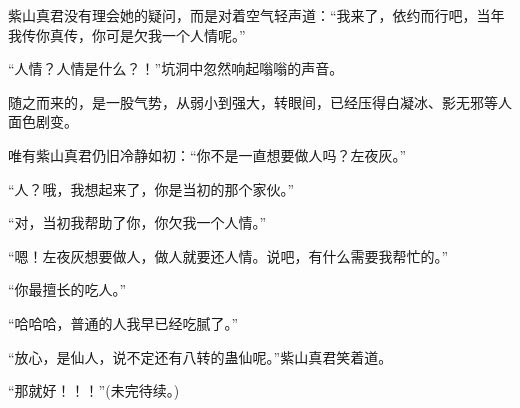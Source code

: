 \begin{this_body}
紫山真君没有理会她的疑问，而是对着空气轻声道：“我来了，依约而行吧，当年我传你真传，你可是欠我一个人情呢。”

“人情？人情是什么？！”坑洞中忽然响起嗡嗡的声音。

随之而来的，是一股气势，从弱小到强大，转眼间，已经压得白凝冰、影无邪等人面色剧变。

唯有紫山真君仍旧冷静如初：“你不是一直想要做人吗？左夜灰。”

“人？哦，我想起来了，你是当初的那个家伙。”

“对，当初我帮助了你，你欠我一个人情。”

“嗯！左夜灰想要做人，做人就要还人情。说吧，有什么需要我帮忙的。”

“你最擅长的吃人。”

“哈哈哈，普通的人我早已经吃腻了。”

“放心，是仙人，说不定还有八转的蛊仙呢。”紫山真君笑着道。

“那就好！！！”(未完待续。)

\end{this_body}

